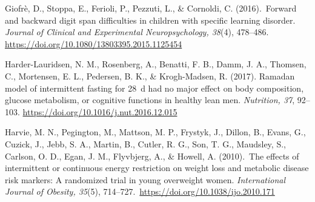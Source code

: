 \documentclass[authordate, empirical,issue]{jote-new-article}
\begin{document}
Giofrè, D., Stoppa, E., Ferioli, P., Pezzuti, L., \& Cornoldi, C. (2016). Forward and backward digit span difficulties in children with specific learning disorder.\emph{ Journal of Clinical and Experimental Neuropsychology, 38}(4), 478--486. \url{https://doi.org/10.1080/13803395.2015.1125454}












Harder-Lauridsen, N. M., Rosenberg, A., Benatti, F. B., Damm, J. A., Thomsen, C., Mortensen, E. L., Pedersen, B. K., \& Krogh-Madsen, R. (2017). Ramadan model of intermittent fasting for 28 d had no major effect on body composition, glucose metabolism, or cognitive functions in healthy lean men. \emph{Nutrition, 37}, 92--103. \url{https://doi.org/10.1016/j.nut.2016.12.015}



Harvie, M. N., Pegington, M., Mattson, M. P., Frystyk, J., Dillon, B., Evans, G., Cuzick, J., Jebb, S. A., Martin, B., Cutler, R. G., Son, T. G., Maudsley, S., Carlson, O. D., Egan, J. M., Flyvbjerg, A., \& Howell, A. (2010). The effects of intermittent or continuous energy restriction on weight loss and metabolic disease risk markers: A randomized trial in young overweight women.\emph{ International Journal of Obesity, 35}(5), 714--727. \url{https://doi.org/10.1038/ijo.2010.171}



\end{document}

